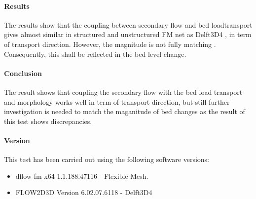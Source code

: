 \paragraph*{Results}

The results show that the coupling between secondary flow and bed loadtransport gives almost similar in structured and unstructured FM net as Delft3D4 , in term of transport direction. However, the magnitude is not fully matching . Consequently, this shall be reflected in the bed level change.

\paragraph*{Conclusion}
The result shows that coupling the secondary flow with the  bed load transport and morphology works well in term of transport direction, but still further investigation is needed to match the maganitude of bed changes as the result of this test shows discrepancies.
\paragraph*{Version}
This test has been carried out using the following software versions:
\begin{itemize}
	
	\item[$\bullet$] dflow-fm-x64-1.1.188.47116 - Flexible Mesh. 
	\item[$\bullet$] FLOW2D3D Version 6.02.07.6118 - Delft3D4
	
\end{itemize}


